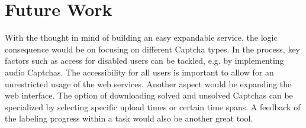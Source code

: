 \section{Future Work}
\label{sec:future_work}

With the thought in mind of building an easy expandable service, the logic consequence would be on focusing on different Captcha types. In the process, key factors such as access for disabled users can be tackled, e.g. by implementing audio Captchas. The accessibility for all users is important to allow for an unrestricted usage of the web services.
Another aspect would be expanding the web interface. The option of downloading solved and unsolved Captchas can be specialized by selecting specific upload times or certain time spans. A feedback of the labeling progress within a task would also be another great tool.


\clearpage